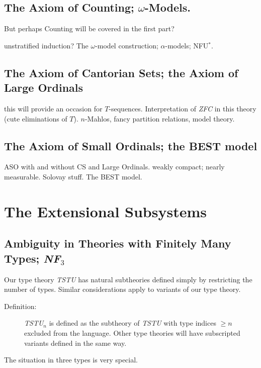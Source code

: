 \documentclass[12pt]{book}
\begin{document}
\subsection{The Axiom of Counting; $\omega$-Models.}

But perhaps Counting will be covered in the first part?

unstratified induction?  The $\omega$-model construction;
$\alpha$-models; NFU$^*$.

\subsection{The Axiom of Cantorian Sets; the Axiom of Large Ordinals}

this will provide an occasion for $T$-sequences.  Interpretation of
{\em ZFC\/} in this theory (cute eliminations of $T$).  $n$-Mahlos,
fancy partition relations, model theory.

\subsection{The Axiom of Small Ordinals; the BEST model}

ASO with and without CS and Large Ordinals.  weakly compact; nearly
measurable.  Solovay stuff.  The BEST model.

\section{The Extensional Subsystems}

\subsection
{Ambiguity in Theories with Finitely Many Types; {\em NF$_3$\/}}

Our type theory {\em TSTU\/} has natural subtheories defined simply by
restricting the number of types.  Similar considerations apply to
variants of our type theory.

\begin{description}

\item[Definition:] {\em TSTU$_n$\/} is defined as the subtheory of
{\em TSTU\/} with type indices $\geq n$ excluded from the language.
Other type theories will have subscripted variants defined in the same
way.

\end{description}

The situation in three types is very special.
\end{document}
